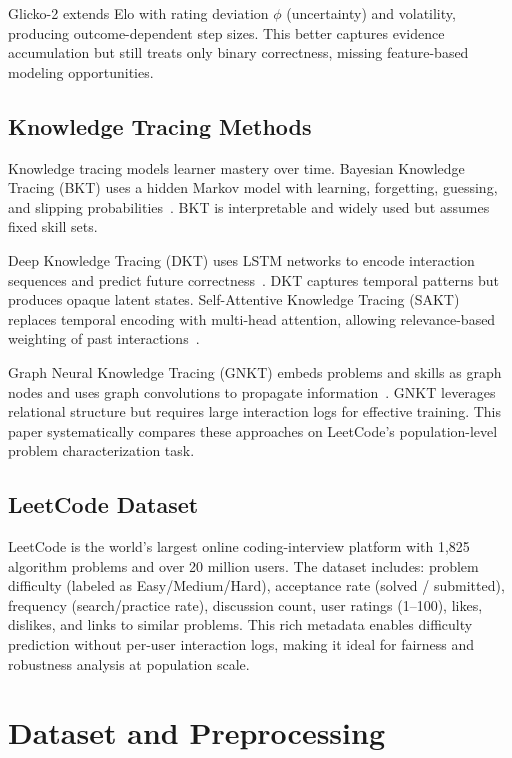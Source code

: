 \documentclass[conference]{IEEEtran}
\begin{document}
Glicko-2 extends Elo with rating deviation $\phi$ (uncertainty) and volatility, producing outcome-dependent step sizes. This better captures evidence accumulation but still treats only binary correctness, missing feature-based modeling opportunities.

\subsection{Knowledge Tracing Methods}
Knowledge tracing models learner mastery over time. Bayesian Knowledge Tracing (BKT) uses a hidden Markov model with learning, forgetting, guessing, and slipping probabilities~\cite{corbett1994bkt}. BKT is interpretable and widely used but assumes fixed skill sets.

Deep Knowledge Tracing (DKT) uses LSTM networks to encode interaction sequences and predict future correctness~\cite{piech2015dkt}. DKT captures temporal patterns but produces opaque latent states. Self-Attentive Knowledge Tracing (SAKT) replaces temporal encoding with multi-head attention, allowing relevance-based weighting of past interactions~\cite{pandey2019sakt}.

Graph Neural Knowledge Tracing (GNKT) embeds problems and skills as graph nodes and uses graph convolutions to propagate information~\cite{yang2021gikt}. GNKT leverages relational structure but requires large interaction logs for effective training. This paper systematically compares these approaches on LeetCode's population-level problem characterization task.

\subsection{LeetCode Dataset}
LeetCode is the world's largest online coding-interview platform with 1,825 algorithm problems and over 20 million users. The dataset includes: problem difficulty (labeled as Easy/Medium/Hard), acceptance rate (solved / submitted), frequency (search/practice rate), discussion count, user ratings (1--100), likes, dislikes, and links to similar problems. This rich metadata enables difficulty prediction without per-user interaction logs, making it ideal for fairness and robustness analysis at population scale.

\section{Dataset and Preprocessing}
\end{document}

